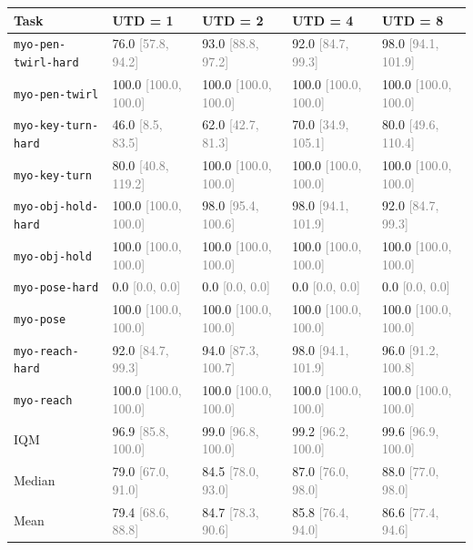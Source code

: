 \begin{tabular}{lllll}
\toprule
\textbf{Task} & \textbf{UTD = 1} & \textbf{UTD = 2} & \textbf{UTD = 4} & \textbf{UTD = 8} \\
\midrule
\texttt{myo-pen-twirl-hard} & 76.0 \textcolor{gray}{[57.8, 94.2]} & 93.0 \textcolor{gray}{[88.8, 97.2]} & 92.0 \textcolor{gray}{[84.7, 99.3]} & 98.0 \textcolor{gray}{[94.1, 101.9]} \\
\texttt{myo-pen-twirl} & 100.0 \textcolor{gray}{[100.0, 100.0]} & 100.0 \textcolor{gray}{[100.0, 100.0]} & 100.0 \textcolor{gray}{[100.0, 100.0]} & 100.0 \textcolor{gray}{[100.0, 100.0]} \\
\texttt{myo-key-turn-hard} & 46.0 \textcolor{gray}{[8.5, 83.5]} & 62.0 \textcolor{gray}{[42.7, 81.3]} & 70.0 \textcolor{gray}{[34.9, 105.1]} & 80.0 \textcolor{gray}{[49.6, 110.4]} \\
\texttt{myo-key-turn} & 80.0 \textcolor{gray}{[40.8, 119.2]} & 100.0 \textcolor{gray}{[100.0, 100.0]} & 100.0 \textcolor{gray}{[100.0, 100.0]} & 100.0 \textcolor{gray}{[100.0, 100.0]} \\
\texttt{myo-obj-hold-hard} & 100.0 \textcolor{gray}{[100.0, 100.0]} & 98.0 \textcolor{gray}{[95.4, 100.6]} & 98.0 \textcolor{gray}{[94.1, 101.9]} & 92.0 \textcolor{gray}{[84.7, 99.3]} \\
\texttt{myo-obj-hold} & 100.0 \textcolor{gray}{[100.0, 100.0]} & 100.0 \textcolor{gray}{[100.0, 100.0]} & 100.0 \textcolor{gray}{[100.0, 100.0]} & 100.0 \textcolor{gray}{[100.0, 100.0]} \\
\texttt{myo-pose-hard} & 0.0 \textcolor{gray}{[0.0, 0.0]} & 0.0 \textcolor{gray}{[0.0, 0.0]} & 0.0 \textcolor{gray}{[0.0, 0.0]} & 0.0 \textcolor{gray}{[0.0, 0.0]} \\
\texttt{myo-pose} & 100.0 \textcolor{gray}{[100.0, 100.0]} & 100.0 \textcolor{gray}{[100.0, 100.0]} & 100.0 \textcolor{gray}{[100.0, 100.0]} & 100.0 \textcolor{gray}{[100.0, 100.0]} \\
\texttt{myo-reach-hard} & 92.0 \textcolor{gray}{[84.7, 99.3]} & 94.0 \textcolor{gray}{[87.3, 100.7]} & 98.0 \textcolor{gray}{[94.1, 101.9]} & 96.0 \textcolor{gray}{[91.2, 100.8]} \\
\texttt{myo-reach} & 100.0 \textcolor{gray}{[100.0, 100.0]} & 100.0 \textcolor{gray}{[100.0, 100.0]} & 100.0 \textcolor{gray}{[100.0, 100.0]} & 100.0 \textcolor{gray}{[100.0, 100.0]} \\
IQM & 96.9 \textcolor{gray}{[85.8, 100.0]} & 99.0 \textcolor{gray}{[96.8, 100.0]} & 99.2 \textcolor{gray}{[96.2, 100.0]} & 99.6 \textcolor{gray}{[96.9, 100.0]} \\
Median & 79.0 \textcolor{gray}{[67.0, 91.0]} & 84.5 \textcolor{gray}{[78.0, 93.0]} & 87.0 \textcolor{gray}{[76.0, 98.0]} & 88.0 \textcolor{gray}{[77.0, 98.0]} \\
Mean & 79.4 \textcolor{gray}{[68.6, 88.8]} & 84.7 \textcolor{gray}{[78.3, 90.6]} & 85.8 \textcolor{gray}{[76.4, 94.0]} & 86.6 \textcolor{gray}{[77.4, 94.6]} \\
\bottomrule
\end{tabular}
